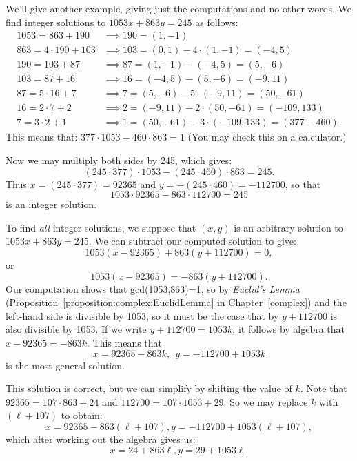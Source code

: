 \begin{example}{}
We'll give another example, giving just the computations and no other words. We find integer solutions to $1053x + 863y =245$ as follows:
\begin{align*}
1053 = 863 + 190 &\implies 190 = (1,-1)\\
863 = 4 \cdot 190 +103 & \implies 103 = (0,1) - 4\cdot (1,-1) = (-4,5)\\
190 = 103 + 87 &\implies 87 = (1,-1) - (-4,5) = (5,-6)\\
103 = 87  + 16 &\implies 16 = (-4,5) - (5,-6) = (-9,11)\\
87 = 5 \cdot 16 + 7 &\implies 7 = (5,-6) - 5\cdot (-9,11) = (50,-61)\\
16 = 2 \cdot 7 + 2 &\implies 2 = (-9,11) - 2 \cdot(50,-61) = (-109,133)\\
7 = 3 \cdot 2 + 1 &\implies 1 = (50,-61) - 3 \cdot(-109,133) = (377 -460).
\end{align*}
This means that:  $377 \cdot 1053  - 460 \cdot 863 = 1$  (You may check this on a calculator.)  

\noindent
Now we may multiply both sides by 245, which gives:  
$$(245 \cdot 377)\cdot 1053 - (245 \cdot 460)\cdot 863 = 245.$$
Thus $x=(245 \cdot 377) =92365$ and $y=- (245 \cdot 460) =-112700$, so that
$$1053 \cdot 92365  - 863 \cdot 112700 = 245$$ 
is an integer solution.

To find \emph{all} integer solutions, we suppose that $(x,y)$ is an arbitrary solution to  $1053x + 863y = 245$. We can  subtract our computed solution to give:
$$1053(x-92365) + 863(y+112700) = 0,$$
or
$$1053(x-92365) = -863(y+112700).$$
Our computation shows that gcd(1053,863)=1, so by \emph{Euclid's Lemma} (Proposition~\ref{proposition:complex:EuclidLemma} in Chapter~\ref{complex}) and the left-hand side is divisible by 1053, so it must be the case that by $y + 112700$ is also divisible by 1053.  If we write $y + 112700 = 1053k$, it follows by algebra that $x - 92365 = -863k$. This means that 
$$ x = 92365 - 863k,~~ y = -112700 + 1053k$$
is the most general solution.  

This solution is correct, but we can simplify by shifting the value of $k$.  Note that $92365 = 107 \cdot 863 + 24$ and $112700 = 107 \cdot 1053 + 29$.  So we may replace $k$ with $(\ell + 107)$ to obtain:
$$ x = 92365 - 863(\ell + 107), y = -112700 + 1053(\ell + 107),$$
which after working out the algebra gives us:
$$ x = 24 + 863 \ell, y = 29 + 1053 \ell.$$
\end{example}
 
